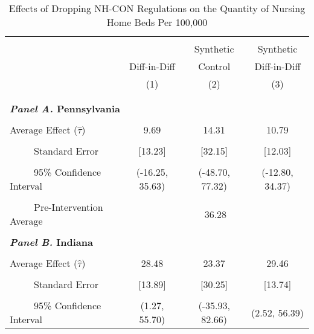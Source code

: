 \documentclass[../Main.tex]{subfiles}
\begin{document}
\newpage
\null
\vfill
\begin{table}[htbp]\centering \footnotesize
\def\sym#1{\ifmmode^{#1}\else\(^{#1}\)\fi}
\captionsetup{width=.75\textwidth}
\caption{\centering Effects of Dropping NH-CON Regulations on the Quantity of Nursing Home Beds Per 100,000}
\label{tab:ave_results_q_nhb}
\setlength{\tabcolsep}{10pt}
\begin{tabular}{l*{3}{c}}
\hline\hline
\\[-2ex]
&\multicolumn{1}{c}{}&\multicolumn{1}{c}{Synthetic}&\multicolumn{1}{c}{Synthetic}\\
&\multicolumn{1}{c}{Diff-in-Diff}&\multicolumn{1}{c}{Control}&\multicolumn{1}{c}{Diff-in-Diff}\\
&\multicolumn{1}{c}{(1)}&\multicolumn{1}{c}{(2)}&\multicolumn{1}{c}{(3)}\\
\\[-2ex]
\hline
\\[-.1ex]
\multicolumn{4}{l}{\textbf{\textit{Panel A.} Pennsylvania}}\\
\\[-1.5ex]
\multicolumn{1}{l}{Average Effect ($\hat{\tau}$)}&   \multicolumn{1}{c}{9.69}&   \multicolumn{1}{c}{14.31}&  \multicolumn{1}{c}{10.79}\\
\\[-2ex]
\multicolumn{1}{l}{\ \ \ \ \ Standard Error}  &\multicolumn{1}{c}{[13.23]}&\multicolumn{1}{c}{[32.15]}&\multicolumn{1}{c}{[12.03]}\\
\\[-2ex]
\multicolumn{1}{l}{\ \ \ \ \ 95\% Confidence Interval}&   \multicolumn{1}{c}{(-16.25, 35.63)}&   \multicolumn{1}{c}{(-48.70, 77.32)}&   \multicolumn{1}{c}{(-12.80, 34.37)}\\
\\[-2ex]
\multicolumn{1}{l}{\ \ \ \ \ Pre-Intervention Average}&   \multicolumn{3}{c}{36.28}\\
\\[-.1ex]
\multicolumn{4}{l}{\textbf{\textit{Panel B.} Indiana}}\\
\\[-1.5ex]
\multicolumn{1}{l}{Average Effect ($\hat{\tau}$)}&   \multicolumn{1}{c}{28.48}&   \multicolumn{1}{c}{23.37}&  \multicolumn{1}{c}{29.46}\\
\\[-2ex]
\multicolumn{1}{l}{\ \ \ \ \ Standard Error}  &\multicolumn{1}{c}{[13.89]}&\multicolumn{1}{c}{[30.25]}&\multicolumn{1}{c}{[13.74]}\\
\\[-2ex]
\multicolumn{1}{l}{\ \ \ \ \ 95\% Confidence Interval}&   \multicolumn{1}{c}{(1.27, 55.70)}&   \multicolumn{1}{c}{(-35.93, 82.66)}&   \multicolumn{1}{c}{(2.52, 56.39)}\\

\end{tabular}
\end{table}
\end{document}
